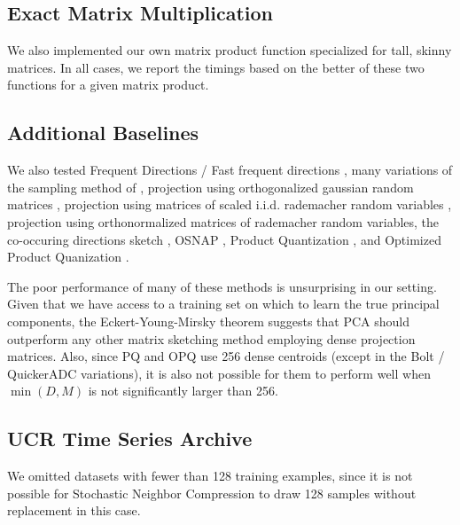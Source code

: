 \subsection{Exact Matrix Multiplication}

We also implemented our own matrix product function specialized for tall, skinny matrices. In all cases, we report the timings based on the better of these two functions for a given matrix product.

\subsection{Additional Baselines}

We also tested Frequent Directions / Fast frequent directions \cite{liberty_simple_2012, ghashami_frequent_2016, isvd}, many variations of the sampling method of \cite{drineas_fast_2006}, projection using orthogonalized gaussian random matrices \cite{superbitLSH}, projection using matrices of scaled i.i.d. rademacher random variables \cite{rademacherJL}, projection using orthonormalized matrices of rademacher random variables, the co-occuring directions sketch \cite{mroueh_co-occuring_2016}, OSNAP \cite{osnap}, Product Quantization \cite{pq}, and Optimized Product Quanization \cite{opq}.

The poor performance of many of these methods is unsurprising in our setting. Given that we have access to a training set on which to learn the true principal components, the Eckert-Young-Mirsky theorem \cite{eckartYoungMirskyThm} suggests that PCA should outperform any other matrix sketching method employing dense projection matrices. Also, since PQ and OPQ use 256 dense centroids (except in the Bolt / QuickerADC variations), it is also not possible for them to perform well when $\min(D, M)$ is not significantly larger than 256.

\subsection{UCR Time Series Archive}

We omitted datasets with fewer than 128 training examples, since it is not possible for Stochastic Neighbor Compression to draw 128 samples without replacement in this case.

